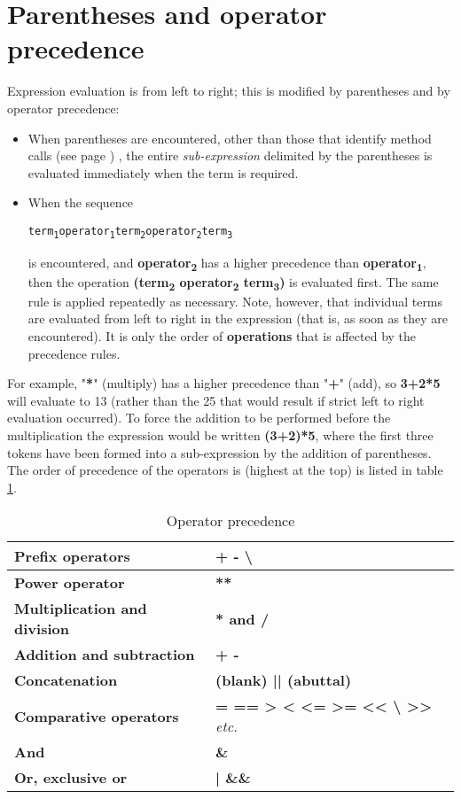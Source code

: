 \section{Parentheses and operator precedence}\label{refpreced}
 Expression evaluation is from left to right; this is modified by
parentheses and by operator precedence:
\begin{itemize}
\item 
When parentheses are encountered, other than those that identify
 method calls (see page \pageref{refmethcon}) , the entire \emph{sub-expression}
delimited by the parentheses is evaluated immediately when the term is
required.
\item When the sequence
\begin{alltt}
term\textsubscript{1} operator\textsubscript{1} term\textsubscript{2} operator\textsubscript{2} term\textsubscript{3}
\end{alltt}
is encountered, and \textbf{operator\textsubscript{2}} has a higher
precedence than \textbf{operator\textsubscript{1}}, then the
operation \textbf{(term\textsubscript{2} operator\textsubscript{2} term\textsubscript{3})} is evaluated
first.
The same rule is applied repeatedly as necessary.
 Note, however, that individual terms are evaluated from left to
right in the expression (that is, as soon as they are encountered).  It
is only the order of \textbf{operations} that is affected by the
precedence rules.
\end{itemize}
For example, "\textbf{*}" (multiply) has a higher precedence
than "\textbf{+}" (add), so \textbf{3+2*5} will evaluate to
13 (rather than the 25 that would result if strict left to right
evaluation occurred).
To force the addition to be performed before the multiplication the
expression would be written \textbf{(3+2)*5}, where the first three
tokens have been formed into a sub-expression by the addition of
parentheses.
 The order of precedence of the operators is (highest at the top) is
 listed in table \ref{table:Operator Precedence}.
\begin{table}\caption{Operator precedence}\label{table:Operator Precedence}
\begin{tabularx}{\textwidth}{>{\bfseries}lX}
\toprule
Prefix operators&\textbf{+  -  \textbackslash }
\\\midrule
Power operator&\textbf{**}
\\\midrule
Multiplication and division&\textbf{* and /}
\\\midrule
Addition and subtraction&\textbf{+  -}
\\\midrule
Concatenation&\textbf{(blank)  ||  (abuttal)}
\\\midrule
Comparative operators&\textbf{=  ==  >  <  <= >=  <<  \textbackslash
  >> } \emph{etc.}
\\\midrule
And&\textbf{\&}
\\\midrule
Or, exclusive or&\textbf{|  \&\&}
\\\bottomrule
\end{tabularx}
\end{table}

